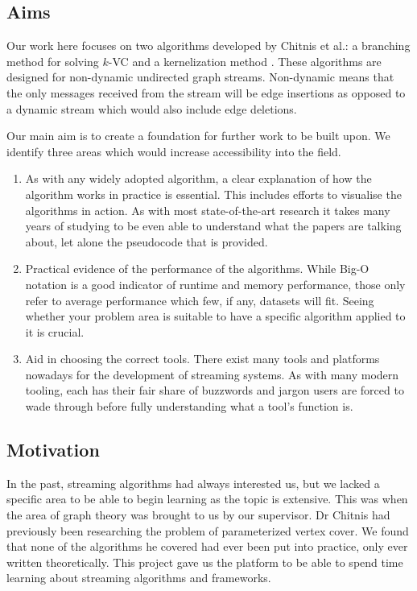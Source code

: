 \subsection{Aims}

Our work here focuses on two algorithms developed by Chitnis et al.: a
branching method for solving \(k\)-VC \cite{chitnis2019towards} and a
kernelization method \cite{chitnis2015parameterized}. These algorithms are
designed for non-dynamic undirected graph streams. Non-dynamic means that the
only messages received from the stream will be edge insertions as opposed to a
dynamic stream which would also include edge deletions.

Our main aim is to create a foundation for further work to be built upon. We
identify three areas which would increase accessibility into the field.

\begin{enumerate}
    \item
          As with any widely adopted algorithm, a clear explanation of how the
          algorithm works in practice is essential. This includes efforts to
          visualise the algorithms in action. As with most state-of-the-art
          research it takes many years of studying to be even able to
          understand what the papers are talking about, let alone the
          pseudocode that is provided.
    \item
          Practical evidence of the performance of the algorithms. While Big-O
          notation is a good indicator of runtime and memory performance, those
          only refer to average performance which few, if any, datasets will
          fit. Seeing whether your problem area is suitable to have a specific
          algorithm applied to it is crucial.
    \item
          Aid in choosing the correct tools. There exist many tools and
          platforms nowadays for the development of streaming systems. As with
          many modern tooling, each has their fair share of buzzwords and
          jargon users are forced to wade through before fully understanding
          what a tool's function is.
\end{enumerate}

\subsection{Motivation}

In the past, streaming algorithms had always interested us, but we lacked a
specific area to be able to begin learning as the topic is extensive. This was
when the area of graph theory was brought to us by our supervisor. Dr Chitnis
had previously been researching the problem of parameterized vertex cover. We
found that none of the algorithms he covered had ever been put into practice,
only ever written theoretically. This project gave us the platform to be able
to spend time learning about streaming algorithms and frameworks.
